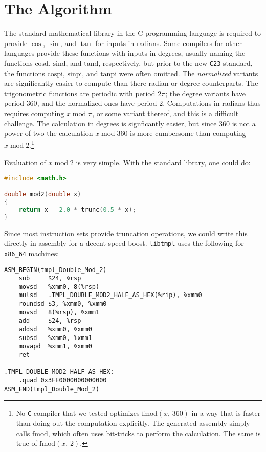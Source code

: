 \documentclass{article}
\theoremstyle{plain}
\begin{document}
    \section{The Algorithm}
        The standard mathematical library in the C programming language is
        required to provide $\cos$, $\sin$, and $\tan$ for inputs in radians.
        Some compilers for other languages provide these functions with inputs
        in degrees, usually naming the functions $\textrm{cosd}$,
        $\textrm{sind}$, and $\textrm{tand}$, respectively, but prior to the
        new \texttt{C23} standard, the functions $\textrm{cospi}$,
        $\textrm{sinpi}$, and $\textrm{tanpi}$ were often omitted. The
        \textit{normalized} variants are significantly easier to compute than
        there radian or degree counterparts.
        The trigonometric functions are periodic with period
        $2\pi$; the degree variants have period $360$, and the normalized ones
        have period $2$.
        Computations in radians thus requires
        computing $x\;\textrm{mod}\;\pi$, or some variant thereof, and this
        is a difficult challenge. The calculation in degrees is signficantly
        easier, but since $360$ is not a power of two the calculation
        $x\;\textrm{mod}\;360$ is more cumbersome than computing
        $x\;\textrm{mod}\;2$.\footnote{%
            No \texttt{C} compiler that we tested optimizes
            $\textrm{fmod}(x,\,360)$ in a way that is faster than doing out
            the computation explicitly. The generated assembly simply calls
            $\textrm{fmod}$, which often uses bit-tricks to perform the
            calculation. The same is true of $\textrm{fmod}(x,\,2)$.
        }
        \par\hfill\par
        Evaluation of $x\;\textrm{mod}\;2$ is very simple. With the
        standard library, one could do:
        \begin{mdframed}
            \begin{lstlisting}[language={C}]
#include <math.h>

double mod2(double x)
{
    return x - 2.0 * trunc(0.5 * x);
}
            \end{lstlisting}
        \end{mdframed}
        Since most instruction sets provide truncation operations, we could
        write this directly in assembly for a decent speed boost.
        \texttt{libtmpl} uses the following for \texttt{x86\_64} machines:
        \begin{mdframed}
            \begin{lstlisting}[language={[x64]Assembler}]
ASM_BEGIN(tmpl_Double_Mod_2)
    sub     $24, %rsp
    movsd   %xmm0, 8(%rsp)
    mulsd   .TMPL_DOUBLE_MOD2_HALF_AS_HEX(%rip), %xmm0
    roundsd $3, %xmm0, %xmm0
    movsd   8(%rsp), %xmm1
    add     $24, %rsp
    addsd   %xmm0, %xmm0
    subsd   %xmm0, %xmm1
    movapd  %xmm1, %xmm0
    ret

.TMPL_DOUBLE_MOD2_HALF_AS_HEX:
    .quad 0x3FE0000000000000
ASM_END(tmpl_Double_Mod_2)
            \end{lstlisting}
        \end{mdframed}
\end{document}
